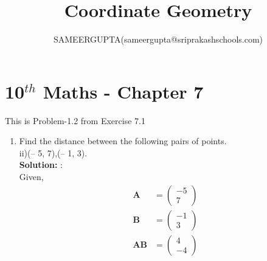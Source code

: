\documentclass[12pt]{article}
\title{Coordinate Geometry}
\author{SAMEERGUPTA(sameergupta@sriprakashschools.com)}
\newcommand{\myvec}[1]{\ensuremath{\begin{pmatrix}#1\end{pmatrix}}}
\newcommand{\solution}{\noindent \textbf{Solution: }}
\let\vec\mathbf
\begin{document}
\maketitle
\section*{10$^{th}$ Maths - Chapter 7}
This is Problem-1.2 from Exercise 7.1
\begin{enumerate}
\item Find the distance between the following pairs of points.\\
 ii)(– 5, 7),(– 1, 3).\\
\solution:\\
Given,
\begin{align}
\vec{A}&=\myvec{-5\\7}\\
\vec{B}&=\myvec{-1\\3}\\
\vec{AB}&=\myvec{4\\-4}\\
\end{align}
\end{enumerate}
\end{document}
